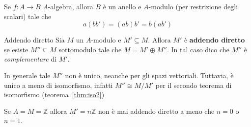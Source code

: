 
\begin{remark}
    Se \(f : A\to B\) \(A\)-algebra, allora \(B\) è un anello e \(A\)-modulo
    (per restrizione degli scalari) tale che 
    \[
      a{(b b')} = {(ab)}b' = b{(ab')}
    \]
\end{remark}

\begin{definition}{Addendo diretto}
    Sia \(M\) un \(A\)-modulo e \(M' \subseteq M \). Allora \(M'\) è
    \textbf{addendo diretto} se esiste \(M'' \subseteq M \) sottomodulo tale che
    \(M = M' \oplus M''\). In tal caso dico che \(M''\) è \emph{complementare}
    di \(M'\).
\end{definition}
\begin{remark}{}
    In generale tale \(M''\) non è unico, neanche per gli spazi vettoriali.
    Tuttavia, è unico a meno di isomorfismo, infatti \(M'' \cong M / M'\) per il
    secondo teorema di isomorfismo (teorema~\ref{thm:iso2})
\end{remark}
\begin{example}{}
    Se \(A = M = \mathbb{Z}\) allora \(M' = n \mathbb{Z}\) non è mai addendo
    diretto a meno che \(n=0\) o \(n=1\).
\end{example}

